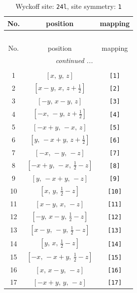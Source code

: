 \documentclass[fleqn,8pt]{jsarticle}
\begin{document}
\begin{longtable}{ccc}
\caption{Wyckoff site: {\tt 24l}, site symmetry: {\tt 1}}
 \\
 \hline \hline
No. & position & mapping \\ \hline \endfirsthead

\multicolumn{2}{l}{\tablename\ \thetable{}} \\
 \hline \hline
No. & position & mapping \\ \hline \endhead

 \hline \hline
\multicolumn{2}{r}{\footnotesize\it continued ...} \\ \endfoot

 \hline \hline
\multicolumn{2}{r}{} \\ \endlastfoot

1 & $\left[ x,\, y,\, z \right]$ & {\tt [1]} \\ \hline
2 & $\left[ x - y,\, x,\, z + \frac{1}{2} \right]$ & {\tt [2]} \\ \hline
3 & $\left[ - y,\, x - y,\, z \right]$ & {\tt [3]} \\ \hline
4 & $\left[ - x,\, - y,\, z + \frac{1}{2} \right]$ & {\tt [4]} \\ \hline
5 & $\left[ - x + y,\, - x,\, z \right]$ & {\tt [5]} \\ \hline
6 & $\left[ y,\, - x + y,\, z + \frac{1}{2} \right]$ & {\tt [6]} \\ \hline
7 & $\left[ - x,\, - y,\, - z \right]$ & {\tt [7]} \\ \hline
8 & $\left[ - x + y,\, - x,\, \frac{1}{2} - z \right]$ & {\tt [8]} \\ \hline
9 & $\left[ y,\, - x + y,\, - z \right]$ & {\tt [9]} \\ \hline
10 & $\left[ x,\, y,\, \frac{1}{2} - z \right]$ & {\tt [10]} \\ \hline
11 & $\left[ x - y,\, x,\, - z \right]$ & {\tt [11]} \\ \hline
12 & $\left[ - y,\, x - y,\, \frac{1}{2} - z \right]$ & {\tt [12]} \\ \hline
13 & $\left[ x - y,\, - y,\, \frac{1}{2} - z \right]$ & {\tt [13]} \\ \hline
14 & $\left[ y,\, x,\, \frac{1}{2} - z \right]$ & {\tt [14]} \\ \hline
15 & $\left[ - x,\, - x + y,\, \frac{1}{2} - z \right]$ & {\tt [15]} \\ \hline
16 & $\left[ x,\, x - y,\, - z \right]$ & {\tt [16]} \\ \hline
17 & $\left[ - x + y,\, y,\, - z \right]$ & {\tt [17]} \\ \hline

\end{longtable}
\end{document}
